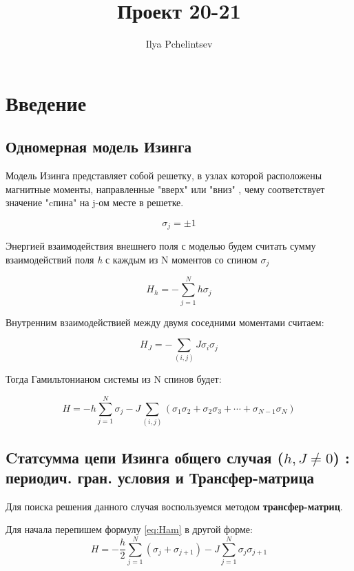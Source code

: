\documentclass{article}
\title{Проект 20-21}
\author{Ilya Pchelintsev}
\date{}
\numberwithin{equation}{section}
\begin{document}
\maketitle

\section{Введение}

\subsection{Одномерная модель Изинга}

Модель Изинга представляет собой решетку, в узлах которой расположены магнитные моменты, направленные "вверх"  или "вниз" , чему соответствует значение "cпина" на j-ом месте в решетке.

\[ \sigma_{j} = \pm1 \]

Энергией взаимодействия внешнего поля с моделью будем считать сумму взаимодействий поля \textit{h} с каждым из N моментов со спином $\sigma_{j}$

\begin{equation}\label{Hh}
  H_{h} = - \sum_{j = 1}^{N} h  \sigma_{j}   
\end{equation}

Внутренним взаимодействией между двумя соседними моментами считаем:

\begin{equation}\label{Hj}
  H_{J} = - \sum_{(i,j)} J  \sigma_{i}  \sigma_{j}
\end{equation}

Тогда Гамильтонианом системы из N спинов будет:

\begin{equation}\label{eq:Ham} 
   H = - h\sum_{j = 1}^{N}  \sigma_{j} - J \sum_{(i,j)} (\sigma_{1} \sigma_{2} + \sigma_{2} \sigma_{3} + \cdots + \sigma_{N-1} \sigma_{N})
\end{equation}

\subsection{Cтатсумма цепи Изинга общего случая ($h, J \neq 0 $) : периодич. гран. условия и Трансфер-матрица}

Для поиска решения данного случая воспользуемся методом \textbf{трансфер-матриц}.

Для начала перепишем формулу \eqref{eq:Ham} в другой форме:
\begin{equation}\label{eq:HamTrM}
    H = - \frac{h}{2}\sum_{j = 1}^{N}  (\sigma_{j} + \sigma_{j+1}) - J \sum_{j = 1}^{N} \sigma_{j}  \sigma_{j+1} 
\end{equation}
\end{document}

